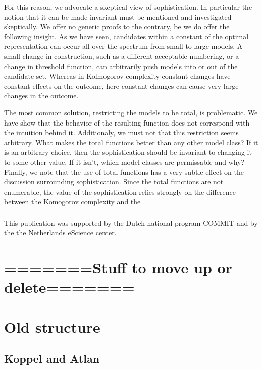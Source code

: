 \documentclass{style/llncs}
\begin{document}
For this reason, we advocate a skeptical view of sophistication. In particular the notion that it can be made invariant must be mentioned and investigated skeptically. We offer no generic proofs to the contrary, be we do offer the following insight. As we have seen, candidates within a constant of the optimal representation can occur all over the spectrum from small to large models. A small change in construction, such as a different acceptable numbering, or a change in threshold function, can arbitrarily push models into or out of the candidate set. Whereas in Kolmogorov complexity constant changes have constant effects on the outcome, here constant changes can cause very large changes in the outcome.

The most common solution, restricting the models to be total, is problematic. We have show that the behavior of the resulting function does not correspond with the intuition behind it. Additionaly, we must not that this restriction seems arbitrary. What makes the total functions better than any other model class? If it is an arbitrary choice, then the sophistication should be invariant to changing it to some other value. If it isn't, which model classes are permissable and why? Finally, we note that the use of total functions has a very subtle effect on the discussion surrounding sophistication. Since the total functions are not enumerable, the value of the sophistication relies strongly on the difference between the Komogorov complexity and the 



\subsubsection*{\ackname}

This publication was supported by the Dutch national program COMMIT and by the the Netherlands eScience center.




\appendix

\section{=======Stuff to move up or delete=======}

\section{Old structure}


\subsection{Koppel and Atlan}
\end{document}
